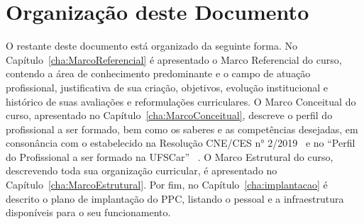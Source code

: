 \section{Organização deste Documento}

O restante deste documento está organizado da seguinte forma. No Capítulo~\ref{cha:MarcoReferencial} é apresentado o Marco Referencial do curso, contendo a área de conhecimento predominante e o campo de atuação profissional, justificativa de sua criação, objetivos, evolução institucional e histórico de suas avaliações e reformulações curriculares. O Marco Conceitual do curso, apresentado no Capítulo~\ref{cha:MarcoConceitual}, descreve o perfil do profissional a ser formado, bem como os saberes e as competências desejadas, em consonância com o estabelecido na Resolução CNE/CES n° 2/2019~\cite{CNE2019} e no ``Perfil do Profissional a ser formado na UFSCar''~\cite{ufscar2008perfil} . O Marco Estrutural do curso, descrevendo toda sua organização curricular, é apresentado no Capítulo~\ref{cha:MarcoEstrutural}. Por fim, no Capítulo~\ref{cha:implantacao} é descrito o plano de implantação do PPC, listando o pessoal e a infraestrutura disponíveis para o seu funcionamento.
